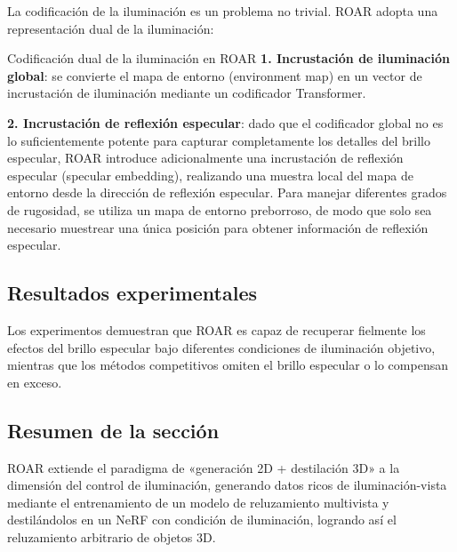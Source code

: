 La codificación de la iluminación es un problema no trivial. ROAR adopta una representación dual de la iluminación:

\begin{importantbox}{Codificación dual de la iluminación en ROAR}
\textbf{1. Incrustación de iluminación global}: se convierte el mapa de entorno (environment map) en un vector de incrustación de iluminación mediante un codificador Transformer.

\textbf{2. Incrustación de reflexión especular}: dado que el codificador global no es lo suficientemente potente para capturar completamente los detalles del brillo especular, ROAR introduce adicionalmente una incrustación de reflexión especular (specular embedding), realizando una muestra local del mapa de entorno desde la dirección de reflexión especular. Para manejar diferentes grados de rugosidad, se utiliza un mapa de entorno preborroso, de modo que solo sea necesario muestrear una única posición para obtener información de reflexión especular.
\end{importantbox}

\subsection{Resultados experimentales}

Los experimentos demuestran que ROAR es capaz de recuperar fielmente los efectos del brillo especular bajo diferentes condiciones de iluminación objetivo, mientras que los métodos competitivos omiten el brillo especular o lo compensan en exceso.

\subsection{Resumen de la sección}

ROAR extiende el paradigma de «generación 2D + destilación 3D» a la dimensión del control de iluminación, generando datos ricos de iluminación-vista mediante el entrenamiento de un modelo de reluzamiento multivista y destilándolos en un NeRF con condición de iluminación, logrando así el reluzamiento arbitrario de objetos 3D.



